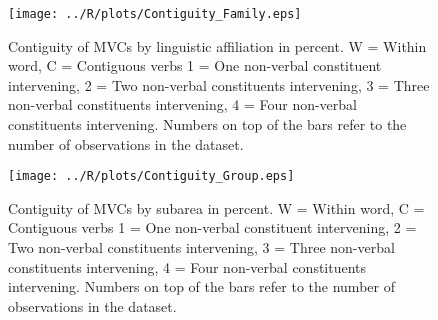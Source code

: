 \begin{figure}
\texttt{[image: ../R/plots/Contiguity\_Family.eps]}
\caption[Contiguity of MVCs by linguistic affiliation]{Contiguity of MVCs by linguistic affiliation in percent. W = Within word, C = Contiguous verbs 1 = One non-verbal constituent intervening, 2 = Two non-verbal constituents intervening, 3 = Three non-verbal constituents intervening, 4 = Four non-verbal constituents intervening. Numbers on top of the bars refer to the number of observations in the dataset.}\label{fig:adj-family}
\end{figure}
\begin{figure}
\texttt{[image: ../R/plots/Contiguity\_Group.eps]}
\caption[Contiguity of MVCs by subarea]{Contiguity of MVCs by subarea in percent. W = Within word, C = Contiguous verbs 1 = One non-verbal constituent intervening, 2 = Two non-verbal constituents intervening, 3 = Three non-verbal constituents intervening, 4 = Four non-verbal constituents intervening. Numbers on top of the bars refer to the number of observations in the dataset.}\label{fig:adj-group}
\end{figure}

